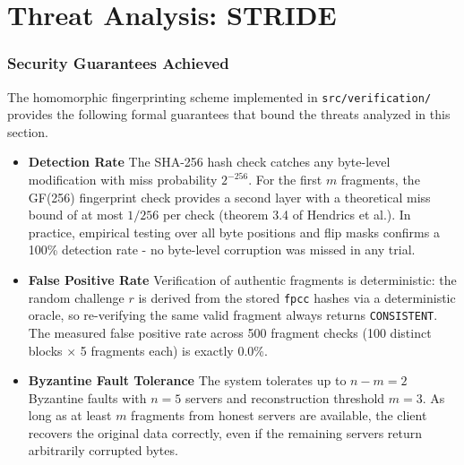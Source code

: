 \documentclass[../veristore_security_model.tex]{subfiles}
\begin{document}
\section{Threat Analysis: STRIDE}


\subsubsection*{Security Guarantees Achieved}

The homomorphic fingerprinting scheme implemented in \texttt{src/verification/} provides the following formal guarantees that bound the threats analyzed in this section.

\begin{itemize}
    \item \textbf{Detection Rate}
    The SHA-256 hash check catches any byte-level modification with miss probability $2^{-256}$. For the first $m$ fragments, the GF(256) fingerprint check provides a second layer with a theoretical miss bound of at most $1/256$ per check (theorem 3.4 of Hendrics et al.). In practice, empirical testing over all byte positions and flip masks confirms a 100\% detection rate - no byte-level corruption was missed in any trial.
    
    \item \textbf{False Positive Rate}
    Verification of authentic fragments is deterministic: the random challenge $r$ is derived from the stored \texttt{fpcc} hashes via a deterministic oracle, so re-verifying the same valid fragment always returns \texttt{CONSISTENT}. The measured false positive rate across 500 fragment checks (100 distinct blocks $\times$ 5 fragments each) is exactly 0.0\%.

    \item \textbf{Byzantine Fault Tolerance}
    The system tolerates up to $n - m = 2$ Byzantine faults with $n = 5$ servers and reconstruction threshold $m = 3$. As long as at least $m$ fragments from honest servers are available, the client recovers the original data correctly, even if the remaining servers return arbitrarily corrupted bytes.
\end{itemize}
\end{document}
